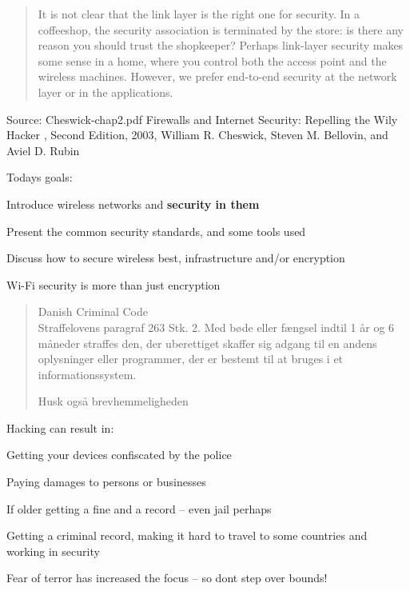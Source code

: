 \documentclass[Screen16to9,17pt]{foils}
\begin{document}

\begin{quote}
It is not clear that the link layer is the right one for security. In a coffeeshop, the security association is terminated by the store: is there any reason you should trust the shopkeeper? Perhaps link-layer security makes some sense in a home, where you control both the access point and the wireless machines. However, we prefer end-to-end security at the network layer or in the
applications.
\end{quote} Source: Cheswick-chap2.pdf Firewalls and Internet Security: Repelling the Wily Hacker , Second Edition, 2003, William R. Cheswick, Steven M. Bellovin, and Aviel D. Rubin

Todays goals:
\begin{list2}
\item Introduce wireless networks and {\bf security in them}
\item Present the common security standards, and some tools used
\item Discuss how to secure wireless best, infrastructure and/or encryption
\item Wi-Fi security is more than just encryption
\end{list2}




\begin{quote}\small
Danish Criminal Code\\
Straffelovens paragraf 263 Stk. 2. Med bøde eller fængsel indtil 1 år og 6 måneder straffes den, der uberettiget skaffer sig adgang til en andens oplysninger eller programmer, der er bestemt til at bruges i et informationssystem.

Husk også brevhemmeligheden
\end{quote}

Hacking can result in:
\begin{list2}
\item Getting your devices confiscated by the police
\item Paying damages to persons or businesses
\item If older getting a fine and a record -- even jail perhaps
\item Getting a criminal record, making it hard to travel to some countries and working in security
\item Fear of terror has increased the focus -- so dont step over bounds!
\end{list2}
\end{document}
